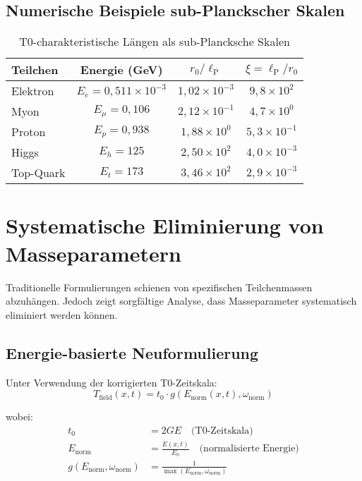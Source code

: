 \documentclass[12pt,a4paper]{report}
\newcommand{\lP}{\ell_{\text{P}}}         %
\newcommand{\rzero}{r_0}                  %
\newcommand{\tzero}{t_0}                  %
\begin{document}
	\subsection{Numerische Beispiele sub-Planckscher Skalen}
	\label{subsec:numerical_sub_planckian}
	
	\begin{table}[htbp]
		\centering
		\begin{tabular}{lccc}
			\toprule
			\textbf{Teilchen} & \textbf{Energie (GeV)} & \textbf{$\rzero/\lP$} & \textbf{$\xi = \lP/\rzero$} \\
			\midrule
			Elektron & $E_e = 0,511 \times 10^{-3}$ & $1,02 \times 10^{-3}$ & $9,8 \times 10^{2}$ \\
			Myon & $E_\mu = 0,106$ & $2,12 \times 10^{-1}$ & $4,7 \times 10^{0}$ \\
			Proton & $E_p = 0,938$ & $1,88 \times 10^{0}$ & $5,3 \times 10^{-1}$ \\
			Higgs & $E_h = 125$ & $2,50 \times 10^{2}$ & $4,0 \times 10^{-3}$ \\
			Top-Quark & $E_t = 173$ & $3,46 \times 10^{2}$ & $2,9 \times 10^{-3}$ \\
			\bottomrule
		\end{tabular}
		\caption{T0-charakteristische Längen als sub-Plancksche Skalen}
		\label{tab:sub_planckian_scales}
	\end{table}
	
	\section{Systematische Eliminierung von Masseparametern}
	\label{sec:mass_elimination}
	
	Traditionelle Formulierungen schienen von spezifischen Teilchenmassen abzuhängen. Jedoch zeigt sorgfältige Analyse, dass Masseparameter systematisch eliminiert werden können.
	
	\subsection{Energie-basierte Neuformulierung}
	\label{subsec:energy_based_reformulation}
	
	Unter Verwendung der korrigierten T0-Zeitskala:
	\begin{equation}
		\boxed{T_{\text{field}}(x,t) = \tzero \cdot g(E_{\text{norm}}(x,t), \omega_{\text{norm}})}
		\label{eq:time_field_energy_based}
	\end{equation}
	
	wobei:
	\begin{align}
		\tzero &= 2GE \quad \text{(T0-Zeitskala)} \\
		E_{\text{norm}} &= \frac{E(x,t)}{E_0} \quad \text{(normalisierte Energie)} \\
		g(E_{\text{norm}}, \omega_{\text{norm}}) &= \frac{1}{\max(E_{\text{norm}}, \omega_{\text{norm}})}
	\end{align}
	
\end{document}
